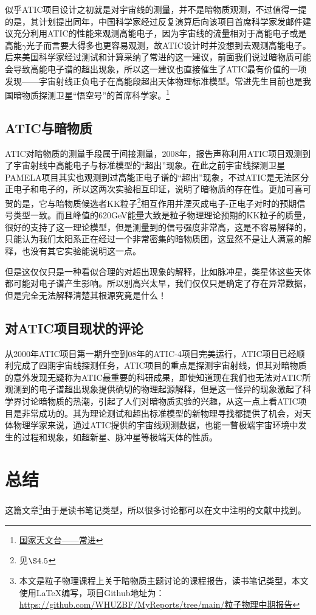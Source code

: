 \documentclass{ctexart}
\newcommand{\dotemph}[1]{\CJKunderdot{#1}}
\begin{document}
	
	似乎ATIC项目设计之初就是对宇宙线的测量，并不是暗物质观测，不过值得一提的是，其计划提出同年，中国科学家\dotemph{常进}经过反复演算后向该项目首席科学家发邮件建议充分利用ATIC的性能来观测高能电子，因为宇宙线的流量相对于高能电子或是高能$\gamma$光子而言要大得多也更容易观测，故ATIC设计时并没想到去观测高能电子。后来美国科学家经过测试和计算采纳了常进的这一建议，前面我们说过暗物质可能会导致高能电子谱的超出现象，所以这一建议也直接催生了ATIC最有价值的一项发现——宇宙射线正负电子在高能段超出天体物理标准模型。常进先生目前也是我国暗物质探测卫星“悟空号”的首席科学家。\footnote{\href{http://nao.cas.cn/gkjj/zb/xrld/202010/t20201026_5722201.html}{国家天文台——常进}}
	
	\subsection{ATIC与暗物质}
	ATIC对暗物质的测量手段属于间接测量，2008年，报告\cite{RN33}声称利用ATIC项目观测到了宇宙射线中高能电子与标准模型的“超出”现象。在此之前宇宙线探测卫星PAMELA项目其实也观测到过高能正电子谱的“超出”现象，不过ATIC是无法区分正电子和电子的，所以这两次实验相互印证，说明了暗物质的存在性。更加可喜可贺的是，它与暗物质候选者KK粒子\footnote{见$\S 4.5$}相互作用并湮灭成电子-正电子对时的预期信号类型一致。而且峰值的620GeV能量大致是粒子物理理论预期的KK粒子的质量，很好的支持了这一理论模型，但是测量到的信号强度非常高，这是不容易解释的，只能认为我们太阳系正在经过一个非常密集的暗物质团，这显然不是让人满意的解释，也没有其它实验能说明这一点。
	
	但是这仅仅只是一种看似合理的对超出现象的解释，比如脉冲星，类星体这些天体都可能对电子谱产生影响。所以别高兴太早，我们仅仅只是确定了存在异常数据，但是完全无法解释清楚其根源究竟是什么！
	\subsection{对ATIC项目现状的评论}
	从2000年ATIC项目第一期升空到08年的ATIC-4项目完美运行，ATIC项目已经顺利完成了四期宇宙线探测任务，ATIC项目的重点是探测宇宙射线，但其对暗物质的意外发现无疑称为ATIC最重要的科研成果，即使知道现在我们也无法对ATIC所观测到的电子谱超出现象提供确切的物理起源解释，但是这一怪异的现象激起了科学界讨论暗物质的热潮，引起了人们对暗物质实验的兴趣，从这一点上看ATIC项目是非常成功的。其为理论测试和超出标准模型的新物理寻找都提供了机会，对天体物理学家来说，通过ATIC提供的宇宙线观测数据，也能一瞥极端宇宙环境中发生的过程和现象，如超新星、脉冲星等极端天体的性质。
	
	
	\section{总结}
	这篇文章\footnote{本文是粒子物理课程上关于暗物质主题讨论的课程报告，读书笔记类型，本文使用\LaTeX 编写，项目Github地址为：\url{https://github.com/WHUZBF/MyReports/tree/main/粒子物理中期报告}}由于是读书笔记类型，所以很多讨论都可以在文中注明的文献中找到。
	
\end{document}
